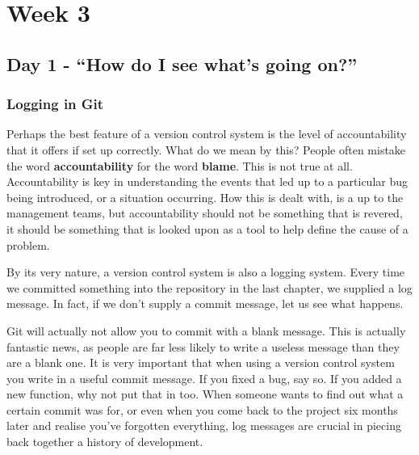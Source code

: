 \cleardoublepage
\chapter{Week 3}
\section{Day 1 - ``How do I see what's going on?''}
\subsection{Logging in Git}
Perhaps the best feature of a version control system is the level of accountability that it offers if set up correctly.
What do we mean by this? People often mistake the word \textbf{accountability} for the word \textbf{blame}.
This is not true at all.
Accountability is key in understanding the events that led up to a particular bug being introduced, or a situation occurring.
How this is dealt with, is a up to the management teams, but accountability should not be something that is revered, it should be something that is looked upon as a tool to help define the cause of a problem.

By its very nature, a version control system is also a logging system.
Every time we committed something into the repository in the last chapter, we supplied a log message.
In fact, if we don't supply a commit message, let us see what happens.


Git will actually not allow you to commit with a blank message.
This is actually fantastic news, as people are far less likely to write a useless message than they are a blank one.
It is very important that when using a version control system you write in a useful commit message.
If you fixed a bug, say so.
If you added a new function, why not put that in too.
When someone wants to find out what a certain commit was for, or even when you come back to the project six months later and realise you've forgotten everything, log messages are crucial in piecing back together a history of development.

